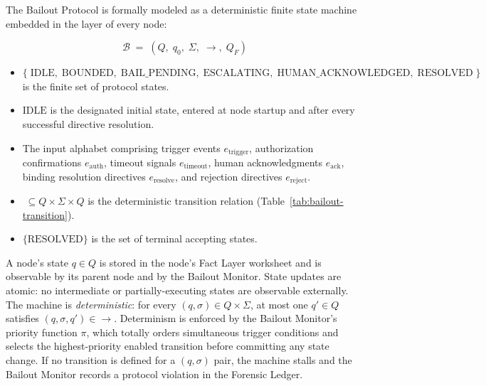The Bailout Protocol is formally modeled as a deterministic finite state machine embedded in the \fact{} layer of every \bxthree{} node:

\[
\mathcal{B} \;=\; (Q,\; q_0,\; \Sigma,\; \rightarrow,\; Q_F)
\]

\begin{itemize}\itemsep=0pt
\item[$Q$] $\{\; \text{IDLE},\; \text{BOUNDED},\; \text{BAIL\_PENDING},\; \text{ESCALATING},\; \text{HUMAN\_ACKNOWLEDGED},\; \text{RESOLVED}\; \}$ is the finite set of protocol states.
\item[$q_0$] $\text{IDLE}$ is the designated initial state, entered at node startup and after every successful directive resolution.
\item[$\Sigma$] The input alphabet comprising trigger events $e_{\text{trigger}}$, authorization confirmations $e_{\text{auth}}$, timeout signals $e_{\text{timeout}}$, human acknowledgments $e_{\text{ack}}$, binding resolution directives $e_{\text{resolve}}$, and rejection directives $e_{\text{reject}}$.
\item[$\rightarrow$] $\; \subseteq Q \times \Sigma \times Q$ is the deterministic transition relation (Table~\ref{tab:bailout-transition}).
\item[$Q_F$] $\{\text{RESOLVED}\}$ is the set of terminal accepting states.
\end{itemize}

A node's state $q \in Q$ is stored in the node's Fact Layer worksheet and is observable by its parent node and by the Bailout Monitor. State updates are atomic: no intermediate or partially-executing states are observable externally. The machine is \emph{deterministic}: for every $(q, \sigma) \in Q \times \Sigma$, at most one $q' \in Q$ satisfies $(q, \sigma, q') \in \rightarrow$. Determinism is enforced by the Bailout Monitor's priority function $\pi$, which totally orders simultaneous trigger conditions and selects the highest-priority enabled transition before committing any state change. If no transition is defined for a $(q, \sigma)$ pair, the machine stalls and the Bailout Monitor records a protocol violation in the Forensic Ledger.

